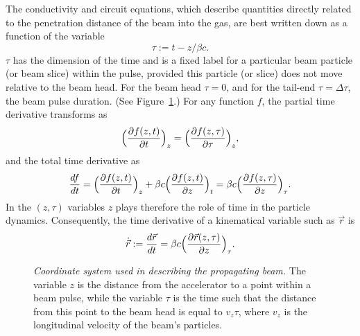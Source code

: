 \documentclass [12pt,a4paper,     ]{report} %
\newcommand{\DEF}{:=}                 %
\begin{document}
   The conductivity and circuit equations, which describe quantities directly related to the penetration distance of the beam into the gas, are best written down as a function of the variable
%
\begin{equation}\label{pla:3} %
    \tau \DEF t - z/\beta c.
\end{equation}
%
$\tau$ has the dimension of the time and is a fixed label for a particular beam particle (or beam slice) within the pulse, provided this particle (or slice) does not move relative to the beam head.  For the beam head $\tau=0$, and for the tail-end $\tau = \Delta \tau$, the beam pulse duration.  (See Figure~\ref{fig:coo}.)  For any function $f$, the partial time derivative transforms as 
%
\begin{equation}\label{pla:4} %
    \Bigl(\frac{\partial f(z,t)   }{\partial    t} \Bigr)_z  = 
    \Bigl(\frac{\partial f(z,\tau)}{\partial \tau} \Bigr)_z, 
\end{equation}
%
and the total time derivative as
%
\begin{equation}\label{pla:5} %
                  \frac{d        f        }{d        t}             =
            \Bigl(\frac{\partial f(z,t)   }{\partial t} \Bigr)_z    +
    \beta c \Bigl(\frac{\partial f(z,t)   }{\partial z} \Bigr)_t    = 
    \beta c \Bigl(\frac{\partial f(z,\tau)}{\partial z} \Bigr)_\tau. 
\end{equation}
%
In the $(z,\tau)$ variables $z$ plays therefore the role of time in the particle dynamics.  Consequently, the time derivative of a kinematical variable such as $\vec{r}$ is
%
\begin{equation}\label{pla:6} %
       \dot{\vec{r}}  \DEF \frac{d \vec{r}}{dt} 
     = \beta c \Bigl(\frac{\partial \vec{r}(z,\tau)}{\partial z} \Bigr)_\tau.
\end{equation}
%

%
\begin{figure}
\begin{center}
\caption[Coordinate system used in describing the propagating beam]{\emph{Coordinate system used in describing the propagating beam.} The variable $z$ is the distance from the accelerator to a point within a beam pulse, while the variable $\tau$ is the time such that the distance from this point to the beam head is equal to $v_z\tau$, where $v_z$ is the longitudinal velocity of the beam's particles.    
\label{fig:coo}}
\end{center}
\end{figure}
%
\end{document}
